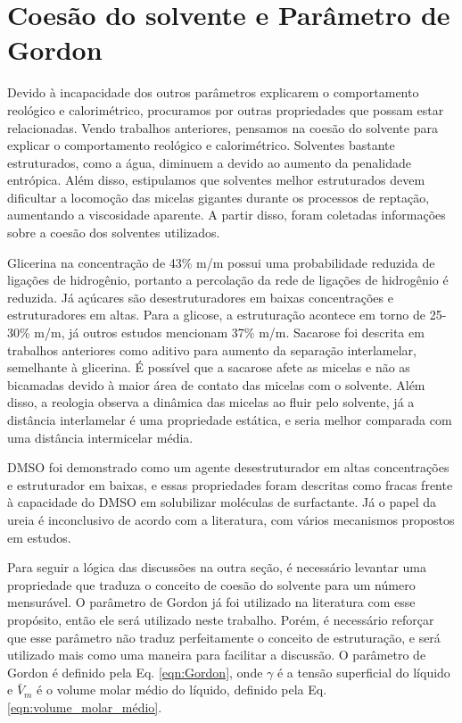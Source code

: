 		
		\FloatBarrier
		\section{Coesão do solvente e Parâmetro de Gordon}  %
		
		Devido à incapacidade dos outros parâmetros explicarem o comportamento reológico e calorimétrico, procuramos por outras propriedades que possam estar relacionadas. Vendo trabalhos anteriores, pensamos na coesão do solvente para explicar o comportamento reológico e calorimétrico. Solventes bastante estruturados, como a água, diminuem a \cmc{} devido ao aumento da penalidade entrópica. Além disso, estipulamos que solventes melhor estruturados devem dificultar a locomoção das micelas gigantes durante os processos de reptação, aumentando a viscosidade aparente. A partir disso, foram coletadas informações sobre a coesão dos solventes utilizados.
		
		Glicerina na concentração de 43\% m/m possui uma probabilidade reduzida de ligações de hidrogênio, portanto a percolação da rede de ligações de hidrogênio é reduzida. Já açúcares são desestruturadores em baixas concentrações e estruturadores em altas. Para a glicose, a estruturação acontece em torno de 25-30\% m/m, já outros estudos mencionam 37\% m/m. Sacarose foi descrita em trabalhos anteriores como aditivo para aumento da separação interlamelar, semelhante à glicerina. É possível que a sacarose afete as micelas e não as bicamadas devido à maior área de contato das micelas com o solvente. Além disso, a reologia observa a dinâmica das micelas ao fluir pelo solvente, já a distância interlamelar é uma propriedade estática, e seria melhor comparada com uma distância intermicelar média.
		
		DMSO foi demonstrado como um agente desestruturador em altas concentrações e estruturador em baixas, e essas propriedades foram descritas como fracas frente à capacidade do DMSO em solubilizar moléculas de surfactante. %
		Já o papel da ureia é inconclusivo de acordo com a literatura, com vários mecanismos propostos em estudos. %
		
		Para seguir a lógica das discussões na outra seção, é necessário levantar uma propriedade que traduza o conceito de coesão do solvente para um número mensurável. O parâmetro de Gordon já foi utilizado na literatura com esse propósito, então ele será utilizado neste trabalho. Porém, é necessário reforçar que esse parâmetro não traduz perfeitamente o conceito de estruturação, e será utilizado mais como uma maneira para facilitar a discussão. O parâmetro de Gordon é definido pela Eq. \ref{eqn:Gordon}, onde \(\gamma\) é a tensão superficial do líquido e \(\bar{V}_m\) é o volume molar médio do líquido, definido pela Eq. \ref{eqn:volume_molar_médio}. 
		
